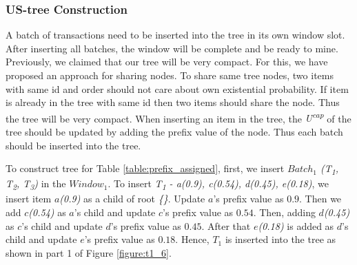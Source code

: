 \documentclass[conference]{IEEEtran}
\begin{document}
\subsubsection{US-tree Construction}
A batch of transactions need to be inserted into the tree in its own window slot. After inserting all batches, the window will be complete and be ready to mine. Previously, we claimed that our tree will be very compact. For this, we have proposed an approach for sharing nodes. To share same tree nodes, two items with same id and order should not care about own existential probability. If item is already in the tree with same id then two items should share the node. Thus the tree will be very compact. When inserting an item in the tree, the \emph{U\textsuperscript{cap}} of the tree should be updated by adding the prefix value of the node. Thus each batch should be inserted into the tree.

To construct tree for Table \ref{table:prefix_assigned}, first, we insert \emph{$Batch_{1}$ (T\textsubscript{1}, T\textsubscript{2}, T\textsubscript{3})} in the $Window_{1}$. To insert \emph{T\textsubscript{1} - a(0.9), c(0.54), d(0.45), e(0.18)}, we insert item \emph{$a$(0.9)} as a child of root \emph{\{\}}. Update $a$'s prefix value as $0.9$. Then we add \emph{$c$(0.54)} as $a$'s child and update $c$'s prefix value as $0.54$. Then, adding \emph{$d$(0.45)} as $c$'s child and update $d$'s prefix value as $0.45$. After that \emph{$e$(0.18)} is added as $d$'s child and update $e$'s prefix value as $0.18$. Hence, \emph{$T_{1}$} is inserted into the tree as shown in part 1 of Figure \ref{figure:t1_6}.
\end{document}
